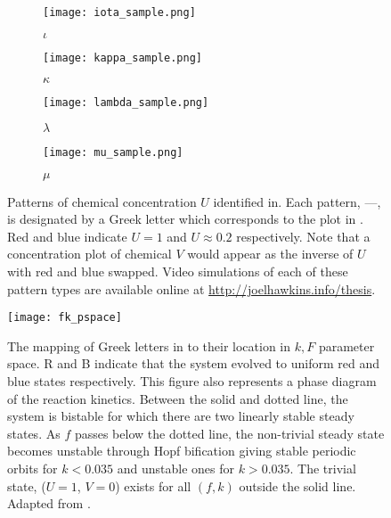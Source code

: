 \begin{figure}
        \begin{subfigure}[b]{0.2\textwidth}
                \texttt{[image: iota\_sample.png]}
                \caption{$\iota$}
                \label{fig:iota_sample}
        \end{subfigure}
         \begin{subfigure}[b]{0.2\textwidth}
                \texttt{[image: kappa\_sample.png]}
                \caption{$\kappa$}
                \label{fig:kappa_sample}
        \end{subfigure}
        \begin{subfigure}[b]{0.2\textwidth}
                \texttt{[image: lambda\_sample.png]}
                \caption{$\lambda$}
                \label{fig:lambda_sample}
        \end{subfigure}
        \begin{subfigure}[b]{0.2\textwidth}
                \texttt{[image: mu\_sample.png]}
                \caption{$\mu$}
                \label{fig:mu_sample}
        \end{subfigure} \hfill
        \caption{Patterns of chemical concentration $U$ identified in. Each pattern, ---, is designated by a Greek letter which corresponds to the plot in . Red and blue indicate $U=1$ and $U\approx 0.2$ respectively. Note that a concentration plot of chemical $V$ would appear as the inverse of $U$ with red and blue swapped. Video simulations of each of these pattern types are available online at \url{http://joelhawkins.info/thesis}.}\label{fig:pearson}
\end{figure}

\begin{figure}[h]
	\centering
	\texttt{[image: fk\_pspace]}
	\caption{The mapping of Greek letters in  to their location in $k, F$ parameter space. R and B indicate that the system evolved to uniform red and blue states respectively. This figure also represents a phase diagram of the reaction kinetics. Between the solid and dotted line, the system is bistable for which there are two linearly stable steady states. As $f$ passes below the dotted line, the non-trivial steady state becomes unstable through Hopf bification giving stable periodic orbits for $k < 0.035$ and unstable ones for $k > 0.035$. The trivial state, ($U =1$, $V = 0$) exists for all $(f,k)$ outside the solid line. Adapted from \protect{}.} \label{fig:fk_pspace}
\end{figure}

